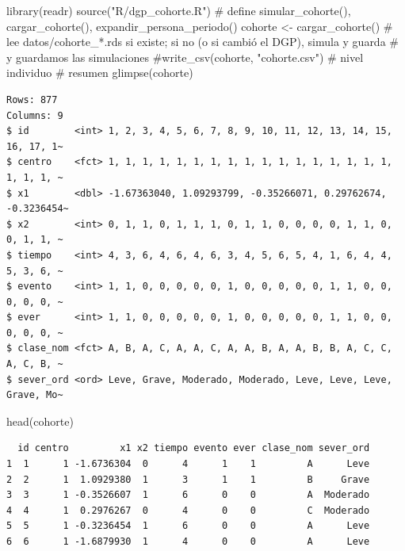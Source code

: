 \documentclass[
  letterpaper,
  DIV=11,
  numbers=noendperiod]{scrartcl}
\newenvironment{Shaded}{\begin{snugshade}}{\end{snugshade}}
\newcommand{\CommentTok}[1]{\textcolor[rgb]{0.37,0.37,0.37}{#1}}
\newcommand{\FunctionTok}[1]{\textcolor[rgb]{0.28,0.35,0.67}{#1}}
\newcommand{\NormalTok}[1]{\textcolor[rgb]{0.00,0.23,0.31}{#1}}
\newcommand{\OtherTok}[1]{\textcolor[rgb]{0.00,0.23,0.31}{#1}}
\newcommand{\StringTok}[1]{\textcolor[rgb]{0.13,0.47,0.30}{#1}}
\begin{document}
\begin{Shaded}
\begin{Highlighting}[]
\FunctionTok{library}\NormalTok{(readr)}
\FunctionTok{source}\NormalTok{(}\StringTok{"R/dgp\_cohorte.R"}\NormalTok{)                        }\CommentTok{\# define simular\_cohorte(), cargar\_cohorte(), expandir\_persona\_periodo()}
\NormalTok{cohorte }\OtherTok{\textless{}{-}} \FunctionTok{cargar\_cohorte}\NormalTok{()                      }\CommentTok{\# lee datos/cohorte\_*.rds si existe; si no (o si cambió el DGP), simula y guarda}
\CommentTok{\# y guardamos las simulaciones}
\CommentTok{\#write\_csv(cohorte, "cohorte.csv")        \# nivel individuo}
\CommentTok{\# resumen}
\FunctionTok{glimpse}\NormalTok{(cohorte)}
\end{Highlighting}
\end{Shaded}

\begin{verbatim}
Rows: 877
Columns: 9
$ id        <int> 1, 2, 3, 4, 5, 6, 7, 8, 9, 10, 11, 12, 13, 14, 15, 16, 17, 1~
$ centro    <fct> 1, 1, 1, 1, 1, 1, 1, 1, 1, 1, 1, 1, 1, 1, 1, 1, 1, 1, 1, 1, ~
$ x1        <dbl> -1.67363040, 1.09293799, -0.35266071, 0.29762674, -0.3236454~
$ x2        <int> 0, 1, 1, 0, 1, 1, 1, 0, 1, 1, 0, 0, 0, 0, 1, 1, 0, 0, 1, 1, ~
$ tiempo    <int> 4, 3, 6, 4, 6, 4, 6, 3, 4, 5, 6, 5, 4, 1, 6, 4, 4, 5, 3, 6, ~
$ evento    <int> 1, 1, 0, 0, 0, 0, 0, 1, 0, 0, 0, 0, 0, 1, 1, 0, 0, 0, 0, 0, ~
$ ever      <int> 1, 1, 0, 0, 0, 0, 0, 1, 0, 0, 0, 0, 0, 1, 1, 0, 0, 0, 0, 0, ~
$ clase_nom <fct> A, B, A, C, A, A, C, A, A, B, A, A, B, B, A, C, C, A, C, B, ~
$ sever_ord <ord> Leve, Grave, Moderado, Moderado, Leve, Leve, Leve, Grave, Mo~
\end{verbatim}

\begin{Shaded}
\begin{Highlighting}[]
\FunctionTok{head}\NormalTok{(cohorte)}
\end{Highlighting}
\end{Shaded}

\begin{verbatim}
  id centro         x1 x2 tiempo evento ever clase_nom sever_ord
1  1      1 -1.6736304  0      4      1    1         A      Leve
2  2      1  1.0929380  1      3      1    1         B     Grave
3  3      1 -0.3526607  1      6      0    0         A  Moderado
4  4      1  0.2976267  0      4      0    0         C  Moderado
5  5      1 -0.3236454  1      6      0    0         A      Leve
6  6      1 -1.6879930  1      4      0    0         A      Leve
\end{verbatim}
\end{document}

